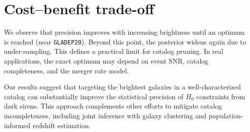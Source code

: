 \section{Cost–benefit trade-off}
We observe that precision improves with increasing brightness until an optimum is reached (near \texttt{GLADEP20}). Beyond this point, the posterior widens again due to under-sampling. This defines a practical limit for catalog pruning. In real applications, the exact optimum may depend on event SNR, catalog completeness, and the merger rate model.

Our results suggest that targeting the brightest galaxies in a well-characterized catalog can substantially improve the statistical precision of $H_0$ constraints from dark sirens. This approach complements other efforts to mitigate catalog incompleteness, including joint inference with galaxy clustering and population-informed redshift estimation.